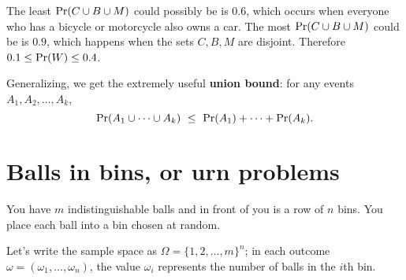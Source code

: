 \documentclass{report}
\theoremstyle{plain}
\theoremstyle{definition}
\newcommand{\pr}{\mbox{\rm Pr}}
\begin{document}
The least $\pr(C \cup B \cup M)$ could possibly be is $0.6$, which occurs when everyone who has a bicycle or motorcycle also owns a car. The most $\pr(C \cup B \cup M)$ could be is $0.9$, which happens when the sets $C,B,M$ are disjoint. Therefore $0.1 \leq \pr(W) \leq 0.4$.
 
Generalizing, we get the extremely useful {\bf union bound}: for any events $A_1, A_2, \ldots, A_k$,
$$ \pr(A_1 \cup \cdots \cup A_k) \ \leq \ \pr(A_1) + \cdots + \pr(A_k) .$$

\section{Balls in bins, or urn problems}

You have $m$ indistinguishable balls and in front of you is a row of $n$ bins. You place each ball into a bin chosen at random.

Let's write the sample space as $\Omega = \{1,2,\ldots, m\}^n$; in each outcome $\omega = (\omega_1, \ldots, \omega_n)$, the value $\omega_i$ represents the number of balls in the $i$th bin.
\end{document}
